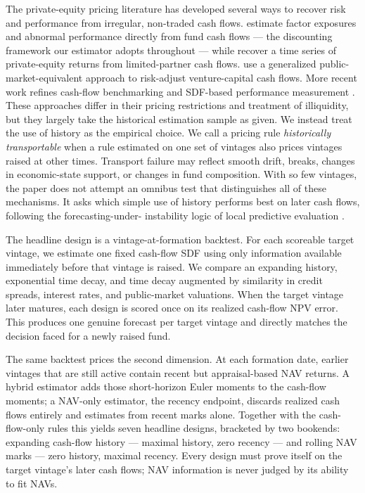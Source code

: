 \documentclass[11pt]{article}
\begin{document}
The private-equity pricing literature has developed several ways to recover
risk and performance from irregular, non-traded cash flows.
\citet{DriessenLinPhalippou2012} estimate factor exposures and abnormal
performance directly from fund cash flows --- the discounting framework our
estimator adopts throughout --- while
\citet{AngChenGoetzmannPhalippou2018} recover a time series of private-equity
returns from limited-partner cash flows. \citet{KortewegNagel2016} use a
generalized public-market-equivalent approach to risk-adjust venture-capital
cash flows. More recent work refines cash-flow benchmarking and SDF-based
performance measurement \citep{GredilGriffithsStucke2023,KortewegNagel2025}.
These approaches differ in their pricing restrictions and treatment of
illiquidity, but they largely take the historical estimation sample as given.
We instead treat the use of history as the empirical choice. We call a pricing
rule \emph{historically transportable} when a rule estimated on one set of
vintages also prices vintages raised at other times. Transport failure may
reflect smooth drift, breaks, changes in economic-state support, or changes in
fund composition. With so few vintages, the paper does not attempt an omnibus
test that distinguishes all of these mechanisms. It asks which simple use of
history performs best on later cash flows, following the forecasting-under-
instability logic of local predictive evaluation
\citep{PesaranTimmermann2007,Rossi2021}.

The headline design is a vintage-at-formation backtest. For each scoreable
target vintage, we estimate one fixed cash-flow SDF using only information
available immediately before that vintage is raised. We compare an expanding
history, exponential time decay, and time decay augmented by similarity in
credit spreads, interest rates, and public-market valuations. When the target
vintage later matures, each design is scored once on its realized cash-flow
NPV error. This produces one genuine forecast per target vintage and directly
matches the decision faced for a newly raised fund.

The same backtest prices the second dimension. At each formation date, earlier
vintages that are still active contain recent but appraisal-based NAV returns.
A hybrid estimator adds those short-horizon Euler moments to the cash-flow
moments; a NAV-only estimator, the recency endpoint, discards realized cash
flows entirely and estimates from recent marks alone. Together with the
cash-flow-only rules this yields seven headline designs, bracketed by two
bookends: expanding cash-flow history --- maximal history, zero recency ---
and rolling NAV marks --- zero history, maximal recency. Every design must
prove itself on the target vintage's later cash flows; NAV information is
never judged by its ability to fit NAVs.
\end{document}
